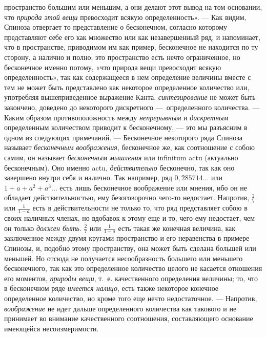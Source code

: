 пространство большим или меньшим, а они делают этот вывод на том основании,
что {\em природа этой вещи} превосходит всякую
определенность». — Как видим, Спиноза
отвергает то представление о бесконечном, согласно которому представляют
себе его как множество или как незавершенный ряд, и напоминает, что в
пространстве, приводимом им как пример, бесконечное не находится по ту
сторону, а налично и полно; это пространство есть нечто ограниченное, но
бесконечное именно потому, «что природа вещи превосходит всякую
определенность», так как содержащееся в нем определение величины вместе с
тем не может быть представлено как некоторое определенное количество или,
употребляя вышеприведенное выражение Канта,
{\em синтезирование} не может быть закончено, доведено
до некоторого дискретного —~определенного количества. — Каким образом
противоположность между {\em непрерывным} и
{\em дискретным} определенным количеством приводит к
бесконечному, — это мы разъясним в одном из следующих примечаний. —
Бесконечное некоторого ряда Спиноза называет
{\em бесконечным воображения}, бесконечное же, как
соотношение с собою самим, он называет {\em бесконечным
мышления} или infinitum actu (актуально бесконечным). Оно именно actu,
{\em действительно} бесконечно, так как оно завершено
внутри себя и налично. Так например, ряд
$0,285714...$ или $1+a+a^2+a^3...$
есть лишь бесконечное воображение или мнения, ибо он не обладает
действительностью, ему безоговорочно чего-то недостает. Напротив,
$\frac 2 7$ или $\frac 1{1-a}$ есть в действительности не только то,
что ряд представляет собою в своих наличных членах, но вдобавок к этому
еще и то, чего ему недостает, чем он только {\em должен быть}.
$\frac 2 7$ или $\frac 1{1-a}$
есть такая же конечная величина, как заключенное между двумя
кругами пространство и его неравенства в примере Спинозы, и, подобно этому
пространству, она может быть сделана большей или меньшей. Но отсюда не
получается несообразность большего или меньшего бесконечного, так как это
определенное количество целого не касается отношения его моментов,
{\em природы вещи}, т.~е. качественного определения
величины; то, что в бесконечном ряде {\em имеется
налицо}, есть также некоторое конечное определенное количество, но кроме
того еще нечто недостаточное. — Напротив,
{\em воображение} не идет дальше определенного
количества как такового и не принимает во внимание качественного
соотношения, составляющего основание имеющейся несоизмеримости.

